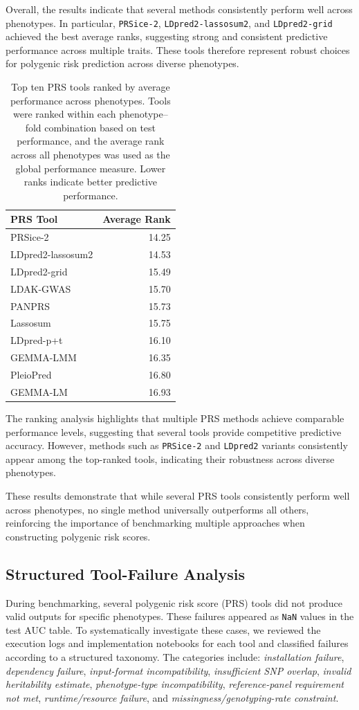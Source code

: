\documentclass[pdflatex,sn-basic]{sn-jnl}
\begin{document}
Overall, the results indicate that several methods consistently perform well across phenotypes. In particular, \texttt{PRSice-2}, \texttt{LDpred2-lassosum2}, and \texttt{LDpred2-grid} achieved the best average ranks, suggesting strong and consistent predictive performance across multiple traits. These tools therefore represent robust choices for polygenic risk prediction across diverse phenotypes.
\begin{table}[!ht]
\centering
\begin{tabular}{lr}
\toprule
\textbf{PRS Tool} & \textbf{Average Rank} \\
\midrule
PRSice-2 & 14.25 \\
LDpred2-lassosum2 & 14.53 \\
LDpred2-grid & 15.49 \\
LDAK-GWAS & 15.70 \\
PANPRS & 15.73 \\
Lassosum & 15.75 \\
LDpred-p+t & 16.10 \\
GEMMA-LMM & 16.35 \\
PleioPred & 16.80 \\
GEMMA-LM & 16.93 \\
\bottomrule
\end{tabular}
\caption{Top ten PRS tools ranked by average performance across phenotypes. Tools were ranked within each phenotype–fold combination based on test performance, and the average rank across all phenotypes was used as the global performance measure. Lower ranks indicate better predictive performance.}
\label{tab:top_tools}
\end{table}
The ranking analysis highlights that multiple PRS methods achieve comparable performance levels, suggesting that several tools provide competitive predictive accuracy. However, methods such as \texttt{PRSice-2} and \texttt{LDpred2} variants consistently appear among the top-ranked tools, indicating their robustness across diverse phenotypes.

These results demonstrate that while several PRS tools consistently perform well across phenotypes, no single method universally outperforms all others, reinforcing the importance of benchmarking multiple approaches when constructing polygenic risk scores.
\subsection{Structured Tool-Failure Analysis}

During benchmarking, several polygenic risk score (PRS) tools did not produce valid outputs for specific phenotypes. These failures appeared as \texttt{NaN} values in the test AUC table. To systematically investigate these cases, we reviewed the execution logs and implementation notebooks for each tool and classified failures according to a structured taxonomy. The categories include: \textit{installation failure}, \textit{dependency failure}, \textit{input-format incompatibility}, \textit{insufficient SNP overlap}, \textit{invalid heritability estimate}, \textit{phenotype-type incompatibility}, \textit{reference-panel requirement not met}, \textit{runtime/resource failure}, and \textit{missingness/genotyping-rate constraint}.
\end{document}
